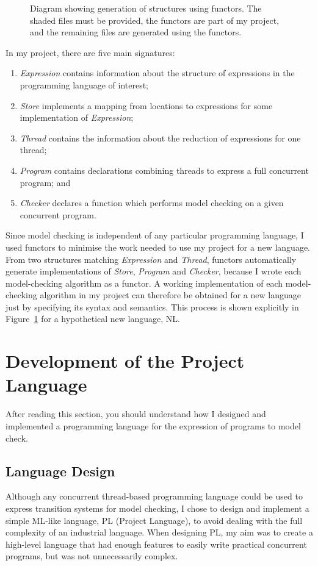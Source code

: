 \documentclass[12pt,a4paper,twoside,openany]{report}
\begin{document}
\begin{figure}
\begin{minipage}{.47\textwidth}
		\caption{Diagram showing generation of
			structures using functors.
			The shaded files must be provided,
			the functors are part of my project,
			and the remaining files
			are generated using the functors.}
		\label{fig:functors}
	\end{minipage}
\end{figure}

In my project, there are five main signatures:
\begin{enumerate}
	\item \emph{Expression}	contains information
	about the structure of expressions
	in the programming language of interest;
	\item \emph{Store} implements
	a mapping from locations
	to expressions for some
	implementation of \emph{Expression};
	\item \emph{Thread} contains the
	information about the reduction of
	expressions for one thread;
	\item \emph{Program} contains declarations
	combining threads to express a full concurrent
	program; and
	\item \emph{Checker} declares a function
	which performs model checking on a given
	concurrent program.
\end{enumerate}

Since model checking is independent of any
particular programming language, I used functors
to minimise the work needed to use my project
for a new language.
From two structures matching \emph{Expression} and \emph{Thread},
functors automatically generate implementations of
\emph{Store}, \emph{Program} and \emph{Checker},
because I wrote
each model-checking algorithm as a functor.
A working implementation of each model-checking
algorithm in my project can therefore be
obtained for a new language just by
specifying its syntax and semantics.
This process is shown explicitly in
Figure~\ref{fig:functors} for
a hypothetical new language, NL.


\section{Development of the Project Language}
\label{sec:language}
After reading this section, you should
understand how I designed
and implemented a programming
language for the expression
of programs to model check.

\subsection{Language Design}
Although any concurrent
thread-based programming language
could be used to express transition systems for model
checking, I chose to design and implement a simple
ML-like language, PL (Project Language), to avoid
dealing with the full complexity of an
industrial language. When designing PL, my aim
was to create a high-level language that had enough features
to easily write practical concurrent programs,
but was not unnecessarily complex.
\end{document}
